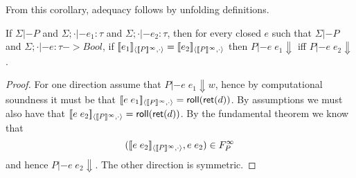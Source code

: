\documentclass[preprint,nocopyrightspace,draft]{sigplanconf}
\begin{document}
From this corollary, adequacy follows by unfolding definitions.

\begin{corollary}
If $\Sigma |- P$ and $\Sigma;\cdot |- e_1 : \tau$ and $\Sigma;\cdot |- e_2 : \tau$, 
then for every closed $e$ such that $\Sigma |- P$ and $\Sigma;\cdot |- e : \tau -> Bool$,
if $\interp{e_1}{\dbrace{P}^\infty}{\cdot} = \interp{e_2}{\dbrace{P}^\infty}{\cdot}$ then  
$P |- e\;e_1 \Downarrow$ iff $P |- e\;e_2 \Downarrow$. 
\end{corollary}
\begin{proof}
For one direction assume that $P |- e\;e_1 \Downarrow w$, hence by computational soundness it must be that 
$[\![e\;e_1]\!]_{\langle {[\![P]\!]^\infty},{\cdot}\rangle} = \mathsf{roll}(\mathsf{ret}(d))$. By assumptions we must also 
have that $[\![e\;e_2]\!]_{\langle {[\![P]\!]^\infty},{\cdot}\rangle} = \mathsf{roll}(\mathsf{ret}(d))$. By the fundamental theorem 
we know that 
\[ ([\![e\;e_2]\!]_{\langle {[\![P]\!]^\infty},{\cdot}\rangle}, e\;e_2) \in F_{P}^\infty \] 
and hence $P |- e\;e_2 \Downarrow$. The other direction is symmetric.
\end{proof}

\end{document}
